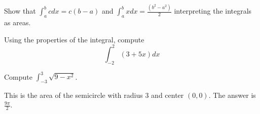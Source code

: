 \documentclass[../main.tex]{subfiles}
\begin{document}
\begin{example}
  Show that $\int_{a}^b c dx =c(b-a)$ and $\int_a^b x dx = \frac{(b^2 - a^2)}{2}$ interpreting the integrals as areas.
\end{example}

\begin{example}
  Using the properties of the integral, compute
  \[
    \int_{-2}^2 (3+5x) dx
  \]
\end{example}

\begin{example}
  Compute $\int_{-3}^3 \sqrt{9 - x^2}$.
\end{example}
\begin{solution}
  This is the area of the semicircle with radius $3$ and center $(0,0)$. The answer is $\frac{9 \pi}{2}$.
\end{solution}
\end{document}
